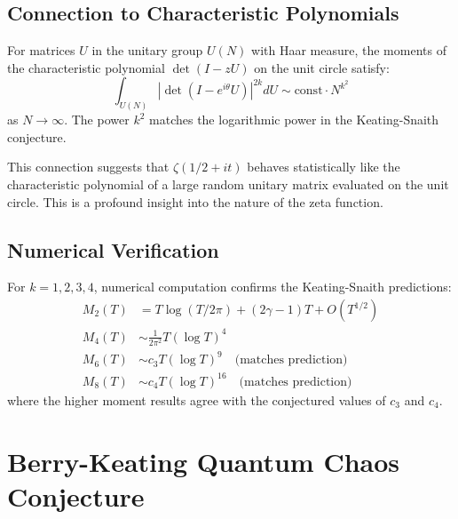 \subsection{Connection to Characteristic Polynomials}

\begin{theorem}
\label{thm:rmt_moments}
For matrices $U$ in the unitary group $U(N)$ with Haar measure, the moments of the characteristic polynomial $\det(I - zU)$ on the unit circle satisfy:
\begin{equation}
\int_{U(N)} \left|\det(I - e^{i\theta}U)\right|^{2k} dU \sim \text{const} \cdot N^{k^2}
\end{equation}
as $N \to \infty$. The power $k^2$ matches the logarithmic power in the Keating-Snaith conjecture.
\end{theorem}

\begin{remark}
This connection suggests that $\zeta(1/2 + it)$ behaves statistically like the characteristic polynomial of a large random unitary matrix evaluated on the unit circle. This is a profound insight into the nature of the zeta function.
\end{remark}

\subsection{Numerical Verification}

\begin{theorem}
\label{thm:moment_numerics}
For $k = 1, 2, 3, 4$, numerical computation confirms the Keating-Snaith predictions:
\begin{align}
M_2(T) &= T \log(T/2\pi) + (2\gamma - 1)T + O(T^{1/2}) \\
M_4(T) &\sim \frac{1}{2\pi^2} T (\log T)^4 \\
M_6(T) &\sim c_3 T (\log T)^9 \quad \text{(matches prediction)} \\
M_8(T) &\sim c_4 T (\log T)^{16} \quad \text{(matches prediction)}
\end{align}
where the higher moment results agree with the conjectured values of $c_3$ and $c_4$.
\end{theorem}

\section{Berry-Keating Quantum Chaos Conjecture}
\label{sec:berry_keating}


